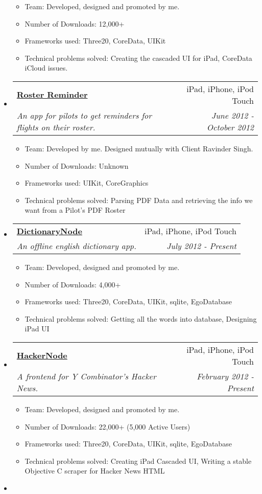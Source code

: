 \documentclass[letterpaper,11pt]{article}
\makeatletter
\newcommand{\resitem}[1]{\item #1 \vspace{-2pt}}
\newcommand{\ressubheading}[4]{
\begin{tabular*}{7.0in}{l@{\extracolsep{\fill}}r}
		\textbf{#1} & #2 \\
		\textit{#3} & \textit{#4} \\
\end{tabular*}\vspace{-6pt}}
\makeatother
\begin{document}
\begin{itemize}
    \begin{itemize}
        \resitem{Team: Developed, designed and promoted by me. }
        \resitem{Number of Downloads:  12,000+}
        \resitem{Frameworks used: Three20, CoreData, UIKit}
        \resitem{Technical problems solved:  Creating the cascaded UI for iPad, CoreData iCloud issues.}
    \end{itemize}
\item
  \ressubheading{\href{https://itunes.apple.com/us/app/sg-pilots-roster-reminder/id561001503}{Roster Reminder}}{iPad, iPhone, iPod Touch}{An app for pilots to get reminders for flights on their roster.}{June 2012 - October 2012}
  \begin{itemize}
        \resitem{Team: Developed by me. Designed mutually with Client Ravinder Singh.}
        \resitem{Number of Downloads:  Unknown}
        \resitem{Frameworks used: UIKit, CoreGraphics}
        \resitem{Technical problems solved: Parsing PDF Data and retrieving the info we want from a Pilot's PDF Roster}
    \end{itemize}
\item
  \ressubheading{\href{http://www.nodemesh.net/dictionarynode}{DictionaryNode}}{iPad, iPhone, iPod Touch}{An offline english dictionary app.}{July 2012 - Present}
   \begin{itemize}
        \resitem{Team: Developed, designed and promoted by me. }
        \resitem{Number of Downloads:  4,000+}
        \resitem{Frameworks used: Three20, CoreData, UIKit, sqlite, EgoDatabase}
        \resitem{Technical problems solved:  Getting all the words into database, Designing iPad UI }
    \end{itemize}
\item
  \ressubheading{\href{http://www.nodemesh.net/hackernode}{HackerNode}}{iPad, iPhone, iPod Touch}{A frontend for Y Combinator's Hacker News.}{February 2012 - Present}
   \begin{itemize}
        \resitem{Team: Developed, designed and promoted by me. }
        \resitem{Number of Downloads:  22,000+ (5,000 Active Users)}
        \resitem{Frameworks used: Three20, CoreData, UIKit, sqlite, EgoDatabase}
        \resitem{Technical problems solved:  Creating iPad Cascaded UI, Writing a stable Objective C scraper for Hacker News HTML}
    \end{itemize}
\item

\vspace{1.2in}
        

\end{itemize}
\end{document}
